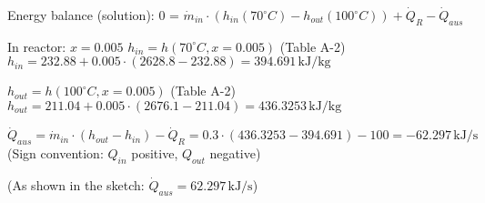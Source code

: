 Energy balance (solution):  
0 = \( \dot{m}_{in} \cdot (h_{in}(70^\circ C) - h_{out}(100^\circ C)) + \dot{Q}_R - \dot{Q}_{aus} \)  

In reactor: \( x = 0.005 \)  
\( h_{in} = h(70^\circ C, x = 0.005) \) (Table A-2)  
\( h_{in} = 232.88 + 0.005 \cdot (2628.8 - 232.88) = 394.691 \, \text{kJ/kg} \)  

\( h_{out} = h(100^\circ C, x = 0.005) \) (Table A-2)  
\( h_{out} = 211.04 + 0.005 \cdot (2676.1 - 211.04) = 436.3253 \, \text{kJ/kg} \)  

\( \dot{Q}_{aus} = \dot{m}_{in} \cdot (h_{out} - h_{in}) - \dot{Q}_R = 0.3 \cdot (436.3253 - 394.691) - 100 = -62.297 \, \text{kJ/s} \)  
(Sign convention: \( Q_{in} \) positive, \( Q_{out} \) negative)  

(As shown in the sketch: \( \dot{Q}_{aus} = 62.297 \, \text{kJ/s} \))